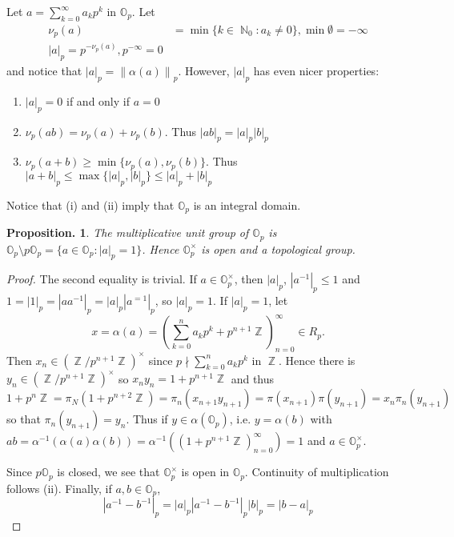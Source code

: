 \documentclass[11pt, a4paper]{memoir}
\DeclareMathOperator{\N}{{\mathbb{N}}}
\DeclareMathOperator{\Z}{{\mathbb{Z}}}
\newcommand{\norm}[1]{\ensuremath{\left\lVert#1\right\rVert}}
\theoremstyle{change}
\newtheorem{proposition}[theorem]{Proposition.}
\theoremstyle{plain}
\theoremstyle{nonumberplain}
\newtheorem{proof}{Proof}
\numberwithin{equation}{section}
\begin{document}
Let $a=\sum_{k=0}^\infty a_kp^k$ in $\mathbb{O}_p$.
Let
\begin{align*}
    \nu_p(a) &= \min\{k\in\N_0:a_k\neq 0\},\min\emptyset=-\infty\\
    |a|_p=p^{-\nu_p(a)},p^{-\infty}=0
\end{align*}
and notice that $|a|_p=\norm{\alpha(a)}_p$.
However, $|a|_p$ has even nicer properties:
\begin{enumerate}[nl,r]
    \item $|a|_p=0$ if and only if $a=0$
    \item $\nu_p(ab)=\nu_p(a)+\nu_p(b)$.
        Thus $|ab|_p=|a|_p|b|_p$
    \item $\nu_p(a+b)\geq\min\{\nu_p(a),\nu_p(b)\}$.
        Thus $|a+b|_p\leq\max\{|a|_p,|b|_p\}\leq|a|_p+|b|_p$
\end{enumerate}
Notice that (i) and (ii) imply that $\mathbb{O}_p$ is an integral domain.
\begin{proposition}
    The multiplicative unit group of $\mathbb{O}_p$ is $\mathbb{O}_p\setminus p\mathbb{O}_p=\{a\in\mathbb{O}_p:|a|_p=1\}$.
    Hence $\mathbb{O}_p^\times$ is open and a topological group.
\end{proposition}
\begin{proof}
    The second equality is trivial.
    If $a\in\mathbb{O}_p^\times$, then $|a|_p$, $|a^{-1}|_p\leq 1$ and $1=|1|_p=|aa^{-1}|_p=|a|_p|a^{=1}|_p$, so $|a|_p=1$.
    If $|a|_p=1$, let
    \begin{equation*}
        x=\alpha(a)=\left(\sum_{k=0}^n a_kp^k+p^{n+1}\Z\right)_{n=0}^\infty\in R_p.
    \end{equation*}
    Then $x_n\in(\Z/p^{n+1}\Z)^\times$ since $p\nmid\sum_{k=0}^n a_kp^k$ in $\Z$.
    Hence there is $y_n\in(\Z/p^{n+1}\Z)^\times$ so $x_ny_n=1+p^{n+1}\Z$ and thus
    \begin{equation*}
        1+p^n\Z=\pi_N(1+p^{n+2}\Z)=\pi_n(x_{n+1}y_{n+1})=\pi(x_{n+1})\pi(y_{n+1})=x_n\pi_n(y_{n+1})
    \end{equation*}
    so that $\pi_n(y_{n+1})=y_n$.
    Thus if $y\in\alpha(\mathbb{O}_p)$, i.e. $y=\alpha(b)$ with $ab=\alpha^{-1}(\alpha(a)\alpha(b))=\alpha^{-1}((1+p^{n+1}\Z)_{n=0}^\infty)=1$ and $a\in\mathbb{O}_p^\times$.

    Since $p\mathbb{O}_p$ is closed, we see that $\mathbb{O}_p^\times$ is open in $\mathbb{O}_p$.
    Continuity of multiplication follows (ii).
    Finally, if $a,b\in\mathbb{O}_p$,
    \begin{equation*}
        |a^{-1}-b^{-1}|_p=|a|_p|a^{-1}-b^{-1}|_p|b|_p=|b-a|_p
    \end{equation*}
\end{proof}
\end{document}
